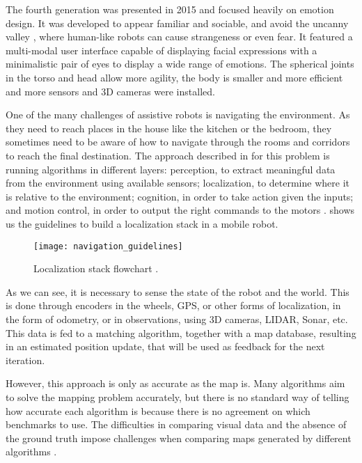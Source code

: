 The fourth generation was presented in 2015 and focused heavily on emotion design. It was developed to appear familiar and sociable, and avoid the uncanny valley \cite{mori2012uncanny}, where human-like robots can cause strangeness or even fear. It featured a multi-modal user interface capable of displaying facial expressions with a minimalistic pair of eyes to display a wide range of emotions. The spherical joints in the torso and head allow more agility, the body is smaller and more efficient and more sensors and 3D cameras were installed.

One of the many challenges of assistive robots is navigating the environment. As they need to reach places in the house like the kitchen or the bedroom, they sometimes need to be aware of how to navigate through the rooms and corridors to reach the final destination. The approach described in \citeauthor{siegwart2011introduction} for this problem is running algorithms in different layers: perception, to extract meaningful data from the environment using available sensors; localization, to determine where it is relative to the environment; cognition, in order to take action given the inputs; and motion control, in order to output the right commands to the motors \cite{siegwart2011introduction}.  shows us the guidelines to build a localization stack in a mobile robot.

\begin{figure}[!ht]
    \centering
    \texttt{[image: navigation\_guidelines]}
    \caption{Localization stack flowchart \cite{siegwart2011introduction}.}
    \label{fig:navigation_guidelines}
\end{figure}

As we can see, it is necessary to sense the state of the robot and the world. This is done through encoders in the wheels, GPS, or other forms of localization, in the form of odometry, or in observations, using 3D cameras, LIDAR, Sonar, etc. This data is fed to a matching algorithm, together with a map database, resulting in an estimated position update, that will be used as feedback for the next iteration.

However, this approach is only as accurate as the map is. Many algorithms aim to solve the mapping problem accurately, but there is no standard way of telling how accurate each algorithm is because there is no agreement on which benchmarks to use. The difficulties in comparing visual data and the absence of the ground truth impose challenges when comparing maps generated by different algorithms \cite{amigoni2007good}.

